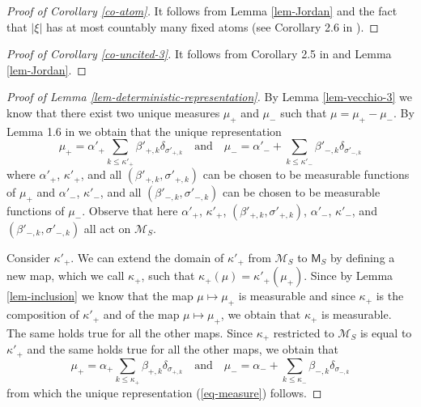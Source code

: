 \documentclass{article}
\theoremstyle{plain}
\theoremstyle{remark}
\begin{document}
\begin{proof}[Proof of Corollary \ref{co-atom}]
	It follows from Lemma \ref{lem-Jordan} and the fact that $|\xi|$ has at most countably many fixed atoms (see Corollary 2.6 in \cite{Kallenberg2}).
\end{proof}

\begin{proof}[Proof of Corollary \ref{co-uncited-3}]
	It follows from Corollary 2.5 in \cite{Kallenberg2} and Lemma \ref{lem-Jordan}.
\end{proof}



\begin{proof}[Proof of Lemma \ref{lem-deterministic-representation}]
	By Lemma  \ref{lem-vecchio-3} we know that there exist two unique measures $\mu_+$ and $\mu_-$ such that $\mu=\mu_+-\mu_-$. By Lemma 1.6 in \cite{Kallenberg2} we obtain that the unique representation
	\begin{equation*}
		\mu_+=\alpha'_+\sum_{k\leq\kappa'_+}\beta'_{+,k}\delta_{\sigma'_{+,k}}\quad\text{and}\quad \mu_-=\alpha'_-+\sum_{k\leq\kappa'_-}\beta'_{-,k}\delta_{\sigma'_{-,k}}
	\end{equation*}
	where $\alpha'_+$, $\kappa'_+$, and all $(\beta'_{+,k},\sigma'_{+,k})$ can be chosen to be measurable functions of $\mu_+$ and $\alpha'_-$, $\kappa'_-$, and all $(\beta'_{-,k},\sigma'_{-,k})$ can be chosen to be measurable functions of $\mu_-$. Observe that here $\alpha'_+$, $\kappa'_+$, $(\beta'_{+,k},\sigma'_{+,k})$, $\alpha'_-$, $\kappa'_-$, and $(\beta'_{-,k},\sigma'_{-,k})$ all act on $\mathcal{M}_S$.
	
	Consider $\kappa'_+$. We can extend the domain of $\kappa'_+$ from $\mathcal{M}_S$ to $\mathsf{M}_S$ by defining a new map, which we call $\kappa_+$, such that $\kappa_+(\mu)=\kappa'_+(\mu_+)$. Since by Lemma \ref{lem-inclusion} we know that the map $\mu\mapsto\mu_+$ is measurable and since $\kappa_+$ is the composition of $\kappa'_+$ and of the map $\mu\mapsto\mu_+$, we obtain that $\kappa_+$ is measurable. The same holds true for all the other maps. Since $\kappa_+$ restricted to $\mathcal{M}_S$ is equal to $\kappa'_+$ and the same holds true for all the other maps, we obtain that
	\begin{equation*}
		\mu_+=\alpha_+\sum_{k\leq\kappa_+}\beta_{+,k}\delta_{\sigma_{+,k}}\quad\text{and}\quad \mu_-=\alpha_-+\sum_{k\leq\kappa_-}\beta_{-,k}\delta_{\sigma_{-,k}}
	\end{equation*}
	from which the unique representation (\ref{eq-measure}) follows. 
	

\end{proof}
\end{document}
